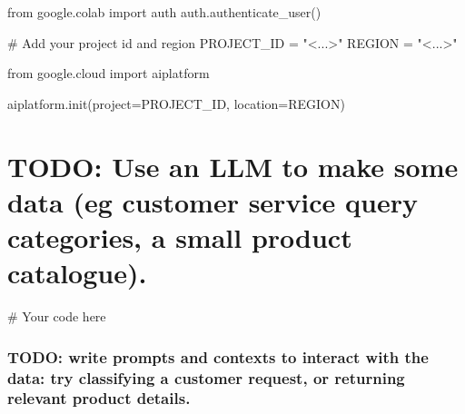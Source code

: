 \documentclass[
  letterpaper,
  DIV=11,
  numbers=noendperiod]{scrreprt}
\newenvironment{Shaded}{\begin{snugshade}}{\end{snugshade}}
\newcommand{\CommentTok}[1]{\textcolor[rgb]{0.37,0.37,0.37}{#1}}
\newcommand{\ImportTok}[1]{\textcolor[rgb]{0.00,0.46,0.62}{#1}}
\newcommand{\NormalTok}[1]{\textcolor[rgb]{0.00,0.23,0.31}{#1}}
\newcommand{\OperatorTok}[1]{\textcolor[rgb]{0.37,0.37,0.37}{#1}}
\newcommand{\StringTok}[1]{\textcolor[rgb]{0.13,0.47,0.30}{#1}}
\begin{document}
\begin{Shaded}
\begin{Highlighting}[]
\ImportTok{from}\NormalTok{ google.colab }\ImportTok{import}\NormalTok{ auth}
\NormalTok{auth.authenticate\_user()}
\end{Highlighting}
\end{Shaded}

\begin{Shaded}
\begin{Highlighting}[]
\CommentTok{\# Add your project id and region}
\NormalTok{PROJECT\_ID }\OperatorTok{=} \StringTok{"\textless{}...\textgreater{}"}
\NormalTok{REGION }\OperatorTok{=} \StringTok{"\textless{}...\textgreater{}"}

\ImportTok{from}\NormalTok{ google.cloud }\ImportTok{import}\NormalTok{ aiplatform}

\NormalTok{aiplatform.init(project}\OperatorTok{=}\NormalTok{PROJECT\_ID, location}\OperatorTok{=}\NormalTok{REGION)}
\end{Highlighting}
\end{Shaded}


\hypertarget{todo-use-an-llm-to-make-some-data-eg-customer-service-query-categories-a-small-product-catalogue.}{%
\chapter{TODO: Use an LLM to make some data (eg customer service query
categories, a small product
catalogue).}\label{todo-use-an-llm-to-make-some-data-eg-customer-service-query-categories-a-small-product-catalogue.}}

\begin{Shaded}
\begin{Highlighting}[]
\CommentTok{\# Your code here}
\end{Highlighting}
\end{Shaded}

\hypertarget{todo-write-prompts-and-contexts-to-interact-with-the-data-try-classifying-a-customer-request-or-returning-relevant-product-details.}{%
\subsection{TODO: write prompts and contexts to interact with the data:
try classifying a customer request, or returning relevant product
details.}\label{todo-write-prompts-and-contexts-to-interact-with-the-data-try-classifying-a-customer-request-or-returning-relevant-product-details.}}
\end{document}
